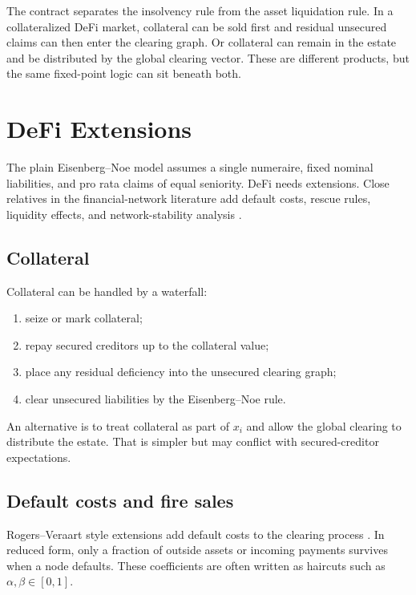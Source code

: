 \documentclass[11pt,oneside]{article}
\begin{document}
The contract separates the insolvency rule from the asset liquidation rule.
In a collateralized DeFi market, collateral can be sold first and residual
unsecured claims can then enter the clearing graph. Or collateral can remain in
the estate and be distributed by the global clearing vector. These are different
products, but the same fixed-point logic can sit beneath both.

\section{DeFi Extensions}

The plain Eisenberg--Noe model assumes a single numeraire, fixed nominal
liabilities, and pro rata claims of equal seniority. DeFi needs extensions.
Close relatives in the financial-network literature add default costs, rescue
rules, liquidity effects, and network-stability analysis
\cite{rogers2013failure,cifuentes2005liquidity,acemoglu2015systemic,glasserman2016contagion}.

\subsection{Collateral}

Collateral can be handled by a waterfall:

\begin{enumerate}[leftmargin=1.5em]
  \item seize or mark collateral;
  \item repay secured creditors up to the collateral value;
  \item place any residual deficiency into the unsecured clearing graph;
  \item clear unsecured liabilities by the Eisenberg--Noe rule.
\end{enumerate}

An alternative is to treat collateral as part of $x_i$ and allow the global
clearing to distribute the estate. That is simpler but may conflict with
secured-creditor expectations.

\subsection{Default costs and fire sales}

Rogers--Veraart style extensions add default costs to the clearing process
\cite{rogers2013failure}. In reduced form, only a fraction of outside assets or
incoming payments survives when a node defaults. These coefficients are often
written as haircuts such as $\alpha,\beta\in[0,1]$.
\end{document}
